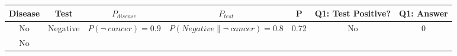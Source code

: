\documentclass[]{book}
\begin{document}
\begin{longtable}[]{@{}ccccccc@{}}
\toprule
\begin{minipage}[b]{0.04\columnwidth}\centering\strut
Disease\strut
\end{minipage} & \begin{minipage}[b]{0.04\columnwidth}\centering\strut
Test\strut
\end{minipage} & \begin{minipage}[b]{0.04\columnwidth}\centering\strut
\(P_{disease}\)\strut
\end{minipage} & \begin{minipage}[b]{0.04\columnwidth}\centering\strut
\(P_{test}\)\strut
\end{minipage} & \begin{minipage}[b]{0.04\columnwidth}\centering\strut
P\strut
\end{minipage} & \begin{minipage}[b]{0.04\columnwidth}\centering\strut
Q1: Test Positive?\strut
\end{minipage} & \begin{minipage}[b]{0.04\columnwidth}\centering\strut
Q1: Answer\strut
\end{minipage}\tabularnewline
\midrule
\endhead
\begin{minipage}[t]{0.04\columnwidth}\centering\strut
No\strut
\end{minipage} & \begin{minipage}[t]{0.04\columnwidth}\centering\strut
Negative\strut
\end{minipage} & \begin{minipage}[t]{0.04\columnwidth}\centering\strut
\(P(\neg \ cancer) = 0.9\)\strut
\end{minipage} & \begin{minipage}[t]{0.04\columnwidth}\centering\strut
\(P(Negative\|\neg \ cancer) = 0.8\)\strut
\end{minipage} & \begin{minipage}[t]{0.04\columnwidth}\centering\strut
0.72\strut
\end{minipage} & \begin{minipage}[t]{0.04\columnwidth}\centering\strut
No\strut
\end{minipage} & \begin{minipage}[t]{0.04\columnwidth}\centering\strut
0\strut
\end{minipage}\tabularnewline
\begin{minipage}[t]{0.04\columnwidth}\centering\strut
No\strut
\end{minipage} & \begin{minipage}[t]{0.04\columnwidth}\centering\strut

\end{minipage}
\end{longtable}
\end{document}
